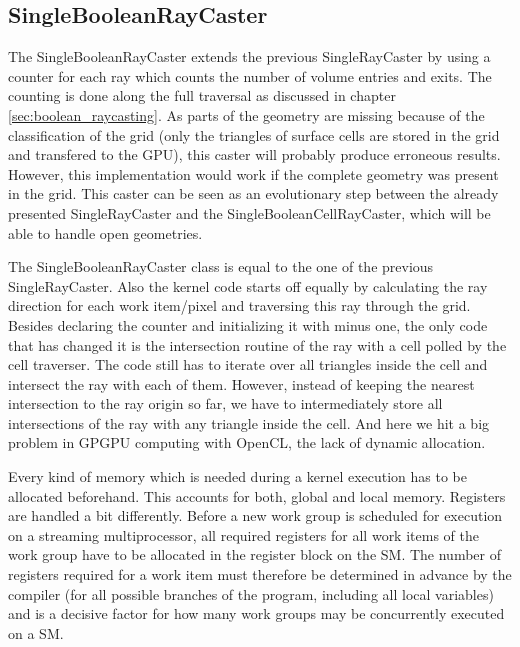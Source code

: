 \subsection{SingleBooleanRayCaster}
\label{sec:single_boolean}

The SingleBooleanRayCaster extends the previous SingleRayCaster by using a counter for each ray which counts the number of volume entries and exits. The counting is done along the full traversal as discussed in chapter \ref{sec:boolean_raycasting}. As parts of the geometry are missing because of the classification of the grid (only the triangles of surface cells are stored in the grid and transfered to the GPU), this caster will probably produce erroneous results. However, this implementation would work if the complete geometry was present in the grid. This caster can be seen as an evolutionary step between the already presented SingleRayCaster and the SingleBooleanCellRayCaster, which will be able to handle open geometries.

The SingleBooleanRayCaster class is equal to the one of the previous SingleRayCaster. Also the kernel code starts off equally by calculating the ray direction for each work item/pixel and traversing this ray through the grid. Besides declaring the counter and initializing it with minus one, the only code that has changed it is the intersection routine of the ray with a cell polled by the cell traverser. The code still has to iterate over all triangles inside the cell and intersect the ray with each of them. However, instead of keeping the nearest intersection to the ray origin so far, we have to intermediately store all intersections of the ray with any triangle inside the cell. And here we hit a big problem in GPGPU computing with OpenCL, the lack of dynamic allocation.

Every kind of memory which is needed during a kernel execution has to be allocated beforehand. This accounts for both, global and local memory. Registers are handled a bit differently. Before a new work group is scheduled for execution on a streaming multiprocessor, all required registers for all work items of the work group have to be allocated in the register block on the SM. The number of registers required for a work item must therefore be determined in advance by the compiler (for all possible branches of the program, including all local variables) and is a decisive factor for how many work groups may be concurrently executed on a SM.

